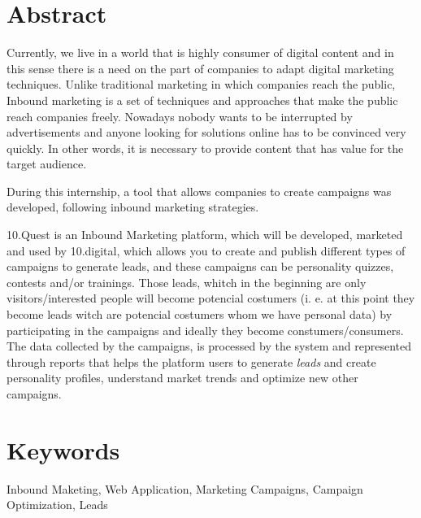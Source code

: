 \section*{Abstract}
\label{sec:abstract}


Currently, we live in a world that is highly consumer of digital content and in this sense there is a need on the part of companies to adapt digital marketing techniques. Unlike traditional marketing in which companies reach the public, Inbound marketing is a set of techniques and approaches that make the public reach companies freely. Nowadays nobody wants to be interrupted by advertisements and anyone looking for solutions online has to be convinced very quickly. In other words, it is necessary to provide content that has value for the target audience.

During this internship, a tool that allows companies to create campaigns was developed, following inbound marketing strategies.

10.Quest is an Inbound Marketing platform, which will be developed, marketed and used by 10.digital, which allows you to create and publish different types of campaigns to generate leads, and these campaigns can be personality quizzes, contests and/or trainings. Those leads, whitch in the beginning are only visitors/interested people will become potencial costumers (i. e. at this point they become leads witch are potencial costumers whom we have personal data) by participating in the campaigns and ideally they become constumers/consumers. The data collected by the campaigns, is processed by the system and represented through reports that helps the platform users to generate \textit {leads} and create personality profiles, understand market trends and optimize new other campaigns.



\section*{Keywords}
\label{sec:keywords}

Inbound Maketing, Web Application, Marketing Campaigns, Campaign Optimization, Leads 
